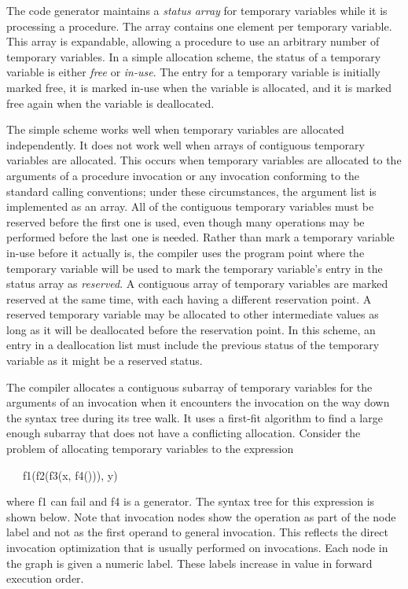 The code generator maintains a \textit{status array} for temporary
variables while it is processing a procedure. The array contains one
element per temporary variable. This array is expandable, allowing a
procedure to use an arbitrary number of temporary variables. In a
simple allocation scheme, the status of a temporary variable is either
\textit{free} or \textit{in-use}. The entry for a temporary variable
is initially marked free, it is marked in-use when the variable is
allocated, and it is marked free again when the variable is
deallocated.

The simple scheme works well when temporary variables are allocated
independently. It does not work well when arrays of contiguous
temporary variables are allocated. This occurs when temporary
variables are allocated to the arguments of a procedure invocation or
any invocation conforming to the standard calling conventions; under
these circumstances, the argument list is implemented as an array. All
of the contiguous temporary variables must be reserved before the
first one is used, even though many operations may be performed before
the last one is needed. Rather than mark a temporary variable in-use
before it actually is, the compiler uses the program point where the
temporary variable will be used to mark the temporary variable's entry
in the status array as \textit{reserved}. A contiguous array of
temporary variables are marked reserved at the same time, with each
having a different reservation point. A reserved temporary variable
may be allocated to other intermediate values as long as it will be
deallocated before the reservation point. In this scheme, an entry in
a deallocation list must include the previous status of the temporary
variable as it might be a reserved status.

The compiler allocates a contiguous subarray of temporary variables
for the arguments of an invocation when it encounters the invocation
on the way down the syntax tree during its tree walk. It uses a
first-fit algorithm to find a large enough subarray that does not have
a conflicting allocation. Consider the problem of allocating temporary
variables to the expression

{\ttfamily\mdseries
\ \ \ f1(f2(f3(x, f4())), y)}

\noindent where f1 can fail and f4 is a generator. The syntax tree for
this expression is shown below. Note that invocation nodes show the
operation as part of the node label and not as the first operand to
general invocation. This reflects the direct invocation optimization
that is usually performed on invocations. Each node in the graph is
given a numeric label. These labels increase in value in forward
execution order.

